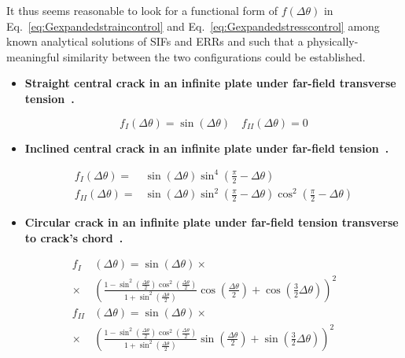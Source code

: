 \documentclass[a4paper,fleqn]{cas-dc}
\begin{document}
It thus seems reasonable to look for a functional form of $f\left(\Delta\theta\right)$ in Eq.~\ref{eq:Gexpandedstraincontrol} and Eq.~\ref{eq:Gexpandedstresscontrol} among known analytical solutions of SIFs and ERRs and such that a physically-meaningful similarity between the two configurations could be established.

\begin{itemize}
\item \textbf{Straight central crack in an infinite plate under far-field transverse tension~\cite{Tada2000}.}

\begin{equation}\label{eq:straightcrack}
f_{I}\left(\Delta\theta\right)=\sin\left(\Delta\theta\right)\quad f_{II}\left(\Delta\theta\right)=0
\end{equation}


\item \textbf{Inclined central crack in an infinite plate under far-field tension~\cite{Tada2000}.}

\begin{equation}\label{eq:inclinedcrack}
\begin{aligned}
f_{I}\left(\Delta\theta\right)=&\sin\left(\Delta\theta\right)\sin^{4}\left(\frac{\pi}{2}-\Delta\theta\right)\\ f_{II}\left(\Delta\theta\right)=&\sin\left(\Delta\theta\right)\sin^{2}\left(\frac{\pi}{2}-\Delta\theta\right)\cos^{2}\left(\frac{\pi}{2}-\Delta\theta\right)
\end{aligned}
\end{equation}

\item \textbf{Circular crack in an infinite plate under far-field tension transverse to crack's chord~\cite{Ioakmidis1977}.}
\end{itemize}

\begin{equation}\label{eq:inclinedcrack}
\begin{aligned}
f_{I}&\left(\Delta\theta\right)=\sin\left(\Delta\theta\right)\times\\\times&\left(\frac{1-\sin^{2}\left(\frac{\Delta\theta}{2}\right)\cos^{2}\left(\frac{\Delta\theta}{2}\right)}{1+\sin^{2}\left(\frac{\Delta\theta}{2}\right)}\cos\left(\frac{\Delta\theta}{2}\right)+\cos\left(\frac{3}{2}\Delta\theta\right)\right)^{2}\\
 f_{II}&\left(\Delta\theta\right)=\sin\left(\Delta\theta\right)\times\\\times&\left(\frac{1-\sin^{2}\left(\frac{\Delta\theta}{2}\right)\cos^{2}\left(\frac{\Delta\theta}{2}\right)}{1+\sin^{2}\left(\frac{\Delta\theta}{2}\right)}\sin\left(\frac{\Delta\theta}{2}\right)+\sin\left(\frac{3}{2}\Delta\theta\right)\right)^{2}
\end{aligned}
\end{equation}
\end{document}
